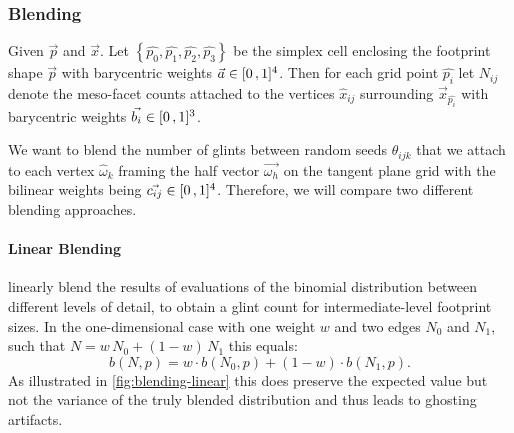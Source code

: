 \subsubsection{Blending}
\label{sec:blending}

Given $\vec{p}$ and $\vec{x}$.
%
Let $\left\{\hat{p_0},\hat{p_1},\hat{p_2},\hat{p_3}\right\}$ be the simplex cell enclosing the footprint shape $\vec{p}$ with barycentric weights $\vec{a} \in [ 0 \,, 1 ]^4$.
%
Then for each grid point $\hat{p_i}$ let $N_{ij}$ denote the meso-facet counts attached to the vertices $\hat{x}_{ij}$ surrounding $\vec{x}_{\hat{p_i}}$ with barycentric weights $\vec{b_i} \in [ 0 \,, 1 ]^3$.




We want to blend the number of glints between random seeds $\theta_{ijk}$ that we attach to each vertex $\hat{\omega}_k$ framing the half vector $\vec{\omega_h}$ on the tangent plane grid with the bilinear weights being $\vec{c_{ij}} \in [ 0 \,, 1 ]^4$.
%
Therefore, we will compare two different blending approaches.



\paragraph{Linear Blending}
\label{sec:blending-linear}
%
\textcite{zirr2016} linearly blend the results of evaluations of the binomial distribution between different levels of detail, to obtain a glint count for intermediate-level footprint sizes.
%
In the one-dimensional case with one weight $w$ and two edges $N_0$ and $N_1$, such that $N=w \, N_0 + (1-w) \, N_1$ this equals:
%
\begin{equation}
    b(N, p) = w \cdot b(N_0, p) + (1-w) \cdot b(N_1, p).
\end{equation}
%
As illustrated in \cref{fig:blending-linear} this does preserve the expected value but not the variance of the truly blended distribution and thus leads to ghosting artifacts.



